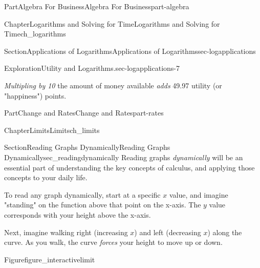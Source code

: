 \documentclass[oneside,10pt,]{tufte-book}
\numberwithin{equation}{chapter}
\begin{document}
\begin{partptx}{Part}{Algebra For Business}{}{Algebra For Business}{}{}{part-algebra}
\begin{chapterptx}{Chapter}{Logarithms and Solving for Time}{}{Logarithms and Solving for Time}{}{}{ch_logarithms}
\begin{sectionptx}{Section}{Applications of Logarithms}{}{Applications of Logarithms}{}{}{sec-logapplications}
\begin{exploration}{Exploration}{Utility and Logarithms.}{sec-logapplications-7}
\begin{enumerate}[font=\bfseries,label=(\alph*),ref=\alph*]
\emph{Multipling by 10} the amount of money available \emph{adds} 49.97 utility (or "happiness") points.%
\end{enumerate}%
\end{exploration}%
\end{sectionptx}
\end{chapterptx}
\end{partptx}
%
%
\typeout{************************************************}
\typeout{************************************************}
%
\begin{partptx}{Part}{Change and Rates}{}{Change and Rates}{}{}{part-rates}
\renewcommand*{\partname}{Part}
%
\typeout{************************************************}
\typeout{************************************************}
%
\begin{chapterptx}{Chapter}{Limits}{}{Limits}{}{}{ch_limits}
\renewcommand*{\chaptername}{Chapter}
\begin{introduction}{}%
%
\end{introduction}%
%
%
\typeout{************************************************}
\typeout{************************************************}
%
\begin{sectionptx}{Section}{Reading Graphs Dynamically}{}{Reading Graphs Dynamically}{}{}{sec_readingdynamically}
Reading graphs \emph{dynamically} will be an essential part of understanding the key concepts of calculus, and applying those concepts to your daily life.%
\par
To read any graph dynamically, start at a specific \(x\) value, and imagine "standing" on the function above that point on the x-axis. The \(y\) value corresponds with your height above the x-axis.%
\par
Next, imagine walking right (increasing \(x\)) and left (decreasing \(x\)) along the curve. As you walk, the curve \emph{forces} your height to move up or down.%
\begin{figureptx}{Figure}{}{figure_interactivelimit}{}%
\begin{sidebyside}{2}{0.075}{0.075}{0.17}%
\begin{sbspanel}{0.47}%

\end{sbspanel}
\end{sidebyside}
\end{figureptx}
\end{sectionptx}
\end{chapterptx}
\end{partptx}
\end{document}
